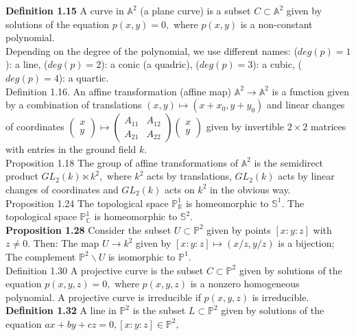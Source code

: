 \documentclass[8pt]{extarticle}
\begin{document}
\textbf{Definition 1.15} A curve in $\mathbb{A}^2$ (a plane curve) is a subset $C \subset \mathbb{A}^2$ given by solutions of the equation $p(x, y) = 0,$ where $p(x, y)$ is a non-constant polynomial.\\
Depending on the degree of the polynomial, we use different names: ($deg(p) = 1$): a line, ($deg(p) = 2$): a conic (a quadric), ($deg(p) = 3$): a cubic, ($deg(p) = 4$): a quartic.\\
Definition 1.16. An affine transformation (affine map) $\mathbb{A}^2 \rightarrow \mathbb{A}^2$ is a function given by a combination of translations $(x, y) \mapsto (x + x_0, y + y_0)$ and linear changes of coordinates $\begin{pmatrix}
x\\
y
\end{pmatrix} \mapsto
\begin{pmatrix}
A_{11} & A_{12}\\
A_{21} & A_{22}
\end{pmatrix}
\begin{pmatrix}
x\\
y
\end{pmatrix}$
given by invertible $2\times 2$ matrices with entries in the ground field $k.$\\
Proposition 1.18 The group of affine transformations of $\mathbb{A}^2$ is the semidirect product $GL_2(k)\ltimes k^2,$ where $k^2$ acts by translations, $GL_2(k)$ acts by linear changes of coordinates and $GL_2(k)$ acts on $k^2$ in the obvious way.\\
Proposition 1.24 The topological space $\mathbb{P}^1_\mathbb{R}$ is homeomorphic to $\mathbb{S}^1.$ The topological space $\mathbb{P}^1_\mathbb{C}$ is homeomorphic to $\mathbb{S}^2.$\\
\textbf{Proposition 1.28} Consider the subset $U \subset \mathbb{P}^2$ given by points $[x : y : z]$ with $z\neq 0.$ Then: The map $U\rightarrow k^2$ given by $[x:y:z]\mapsto(x/z,y/z)$ is a bijection; The complement $\mathbb{P}^2 \backslash U$ is isomorphic to $\mathbb{P}^1.$\\
Definition 1.30 A projective curve is the subset $C \subset \mathbb{P}^2$ given by solutions of the equation $p(x, y, z) = 0,$ where $p(x, y, z)$ is a nonzero homogeneous polynomial. A projective curve is irreducible if $p(x, y, z)$ is irreducible.\\
\textbf{Definition 1.32} A line in $\mathbb{P}^2$ is the subset $L \subset \mathbb{P}^2$ given by solutions of the equation $ax + by + cz = 0, [x : y : z] \in \mathbb{P}^2,$
\end{document}
